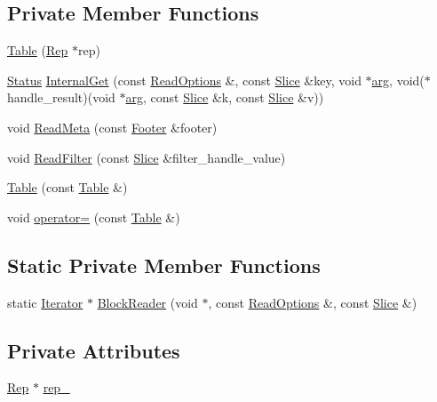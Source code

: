 \subsection*{Private Member Functions}
\begin{DoxyCompactItemize}
\item 
\hyperlink{classleveldb_1_1_table_a145d0ed70dfb8cb92956bb554db222e5}{Table} (\hyperlink{structleveldb_1_1_table_1_1_rep}{Rep} $\ast$rep)
\item 
\hyperlink{classleveldb_1_1_status}{Status} \hyperlink{classleveldb_1_1_table_aea7233eff55aec8dad19befe6de5bd99}{Internal\-Get} (const \hyperlink{structleveldb_1_1_read_options}{Read\-Options} \&, const \hyperlink{classleveldb_1_1_slice}{Slice} \&key, void $\ast$\hyperlink{env__posix_8cc_a9ce2ec4812a92cb6ab39f6e81e9173a9}{arg}, void($\ast$handle\-\_\-result)(void $\ast$\hyperlink{env__posix_8cc_a9ce2ec4812a92cb6ab39f6e81e9173a9}{arg}, const \hyperlink{classleveldb_1_1_slice}{Slice} \&k, const \hyperlink{classleveldb_1_1_slice}{Slice} \&v))
\item 
void \hyperlink{classleveldb_1_1_table_ac7b765e08d8285b2019e1faa6905368e}{Read\-Meta} (const \hyperlink{classleveldb_1_1_footer}{Footer} \&footer)
\item 
void \hyperlink{classleveldb_1_1_table_abe6a44b25318fa50b8e73b5570ef3911}{Read\-Filter} (const \hyperlink{classleveldb_1_1_slice}{Slice} \&filter\-\_\-handle\-\_\-value)
\item 
\hyperlink{classleveldb_1_1_table_ae65d769b917c37227f66221dbd3fe850}{Table} (const \hyperlink{classleveldb_1_1_table}{Table} \&)
\item 
void \hyperlink{classleveldb_1_1_table_a859ec9ca8d2745df17559b0613ac9cba}{operator=} (const \hyperlink{classleveldb_1_1_table}{Table} \&)
\end{DoxyCompactItemize}
\subsection*{Static Private Member Functions}
\begin{DoxyCompactItemize}
\item 
static \hyperlink{classleveldb_1_1_iterator}{Iterator} $\ast$ \hyperlink{classleveldb_1_1_table_a93b3e7e277493cbc63a55e2b141b1f30}{Block\-Reader} (void $\ast$, const \hyperlink{structleveldb_1_1_read_options}{Read\-Options} \&, const \hyperlink{classleveldb_1_1_slice}{Slice} \&)
\end{DoxyCompactItemize}
\subsection*{Private Attributes}
\begin{DoxyCompactItemize}
\item 
\hyperlink{structleveldb_1_1_table_1_1_rep}{Rep} $\ast$ \hyperlink{classleveldb_1_1_table_a5f452efeff7114793e2943215d4c6121}{rep\-\_\-}
\end{DoxyCompactItemize}

